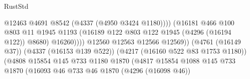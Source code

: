 \begin{lexlean}{RustStd}
\begin{coremodule}
                                                          @12463
                                                          @4691
                                                          @8542
                                                          (@4337 (@4950 @3424 @1180))))
                                                      (@16181
                                                        @466
                                                        @100
                                                        @803
                                                        @11
                                                        @1945
                                                        @1193
                                                        (@16189
                                                          @122
                                                          @803
                                                          @122
                                                          @1945
                                                          (@4296 (@16194 @122))
                                                          @8680)
                                                        @16260))))
                                                @12560
                                                @12563
                                                @12566
                                                @12569))
                                            (@4761 (@16149 @37))
                                            (@4337 (@16153 @139 @522))
                                            (@4217 (@16160 @522 @83 @1753 @1180))
                                            (@4808
                                              @15854
                                              @145
                                              @733
                                              @1180
                                              @1870
                                              (@4817
                                                @15854
                                                @1088
                                                @145
                                                @733
                                                @1870
                                                (@16093
                                                  @46
                                                  @733
                                                  @46
                                                  @1870
                                                  (@4296 (@16098 @46))

\end{coremodule}
\end{lexlean}
